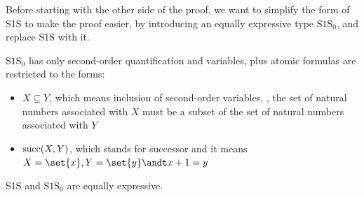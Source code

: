 \documentclass[oneside]{academica}
\begin{document}
Before starting with the other side of the proof, we want to simplify the form of S1S to make the proof easier, by introducing an equally expressive type $\text{S1S}_0$, and replace S1S with it.

\begin{definition*}[$\text{S1S}_0$]
  $\text{S1S}_0$ has only second-order quantification and variables, plus atomic formulas are restricted to the forms:
  \begin{itemize}
    \item $X \subseteq Y$, which means inclusion of second-order variables, \ie, the set of natural numbers associated with $X$ must be a subset of the set of natural numbers associated with $Y$
    \item $\text{succ}(X,Y)$, which stands for successor and it means $X=\set{x}, Y=\set{y} \andt x+1 = y$
  \end{itemize}
\end{definition*}

\begin{theorem*}
  S1S and $\text{S1S}_0$ are equally expressive.
\end{theorem*}
\end{document}
